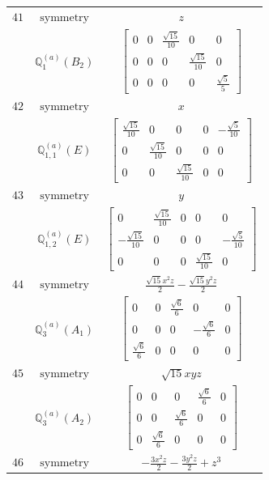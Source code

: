 \documentclass[fleqn,8pt,landscape]{jsarticle}
\begin{document}
\begin{longtable}{ccc}
$ 41 $ & $ \text{symmetry} $ & $ z $ \\
$  $ & $ \mathbb{Q}_{1}^{(a)}(B_{2}) $ & $ \begin{bmatrix} 0 & 0 & \frac{\sqrt{15}}{10} & 0 & 0 \\ 0 & 0 & 0 & \frac{\sqrt{15}}{10} & 0 \\ 0 & 0 & 0 & 0 & \frac{\sqrt{5}}{5} \end{bmatrix} $ \\ \hline
$ 42 $ & $ \text{symmetry} $ & $ x $ \\
$  $ & $ \mathbb{Q}_{1,1}^{(a)}(E) $ & $ \begin{bmatrix} \frac{\sqrt{15}}{10} & 0 & 0 & 0 & - \frac{\sqrt{5}}{10} \\ 0 & \frac{\sqrt{15}}{10} & 0 & 0 & 0 \\ 0 & 0 & \frac{\sqrt{15}}{10} & 0 & 0 \end{bmatrix} $ \\ \hline
$ 43 $ & $ \text{symmetry} $ & $ y $ \\
$  $ & $ \mathbb{Q}_{1,2}^{(a)}(E) $ & $ \begin{bmatrix} 0 & \frac{\sqrt{15}}{10} & 0 & 0 & 0 \\ - \frac{\sqrt{15}}{10} & 0 & 0 & 0 & - \frac{\sqrt{5}}{10} \\ 0 & 0 & 0 & \frac{\sqrt{15}}{10} & 0 \end{bmatrix} $ \\ \hline
$ 44 $ & $ \text{symmetry} $ & $ \frac{\sqrt{15} x^{2} z}{2} - \frac{\sqrt{15} y^{2} z}{2} $ \\
$  $ & $ \mathbb{Q}_{3}^{(a)}(A_{1}) $ & $ \begin{bmatrix} 0 & 0 & \frac{\sqrt{6}}{6} & 0 & 0 \\ 0 & 0 & 0 & - \frac{\sqrt{6}}{6} & 0 \\ \frac{\sqrt{6}}{6} & 0 & 0 & 0 & 0 \end{bmatrix} $ \\ \hline
$ 45 $ & $ \text{symmetry} $ & $ \sqrt{15} x y z $ \\
$  $ & $ \mathbb{Q}_{3}^{(a)}(A_{2}) $ & $ \begin{bmatrix} 0 & 0 & 0 & \frac{\sqrt{6}}{6} & 0 \\ 0 & 0 & \frac{\sqrt{6}}{6} & 0 & 0 \\ 0 & \frac{\sqrt{6}}{6} & 0 & 0 & 0 \end{bmatrix} $ \\ \hline
$ 46 $ & $ \text{symmetry} $ & $ - \frac{3 x^{2} z}{2} - \frac{3 y^{2} z}{2} + z^{3} $ \\

\end{longtable}
\end{document}
